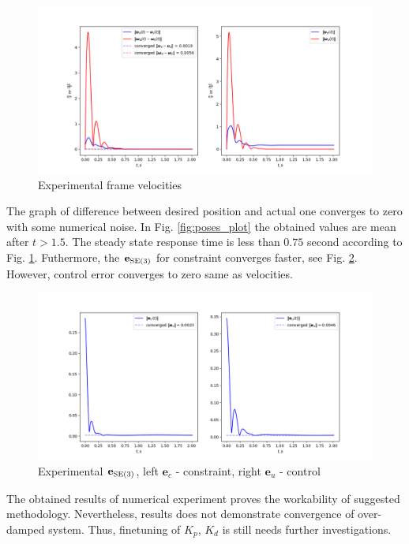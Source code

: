 \begin{figure}[H]
    \centering
    \includegraphics[scale=0.52]{figs/vels_history.png}
    \caption{Experimental frame velocities}
    \label{fig:vels_plot}
\end{figure}

The graph of difference between desired position and actual one converges to 
zero with some numerical noise. In Fig. \ref{fig:poses_plot} the obtained 
values are mean after $t > 1.5$. The steady state response time is less 
than $0.75$ second according to Fig. \ref{fig:vels_plot}. Futhermore, 
the $\mathbf{e}_{\text{SE}(3)}$ for constraint converges faster, see  
Fig. \ref{fig:errors_plot}. However, control error converges to zero 
same as velocities.

\begin{figure}[H]
    \centering
    \includegraphics[scale=0.52]{figs/errors_history.png}
    \caption{Experimental $\mathbf{e}_{\text{SE}(3)}$, left $\mathbf{e}_c$ - constraint, 
    right $\mathbf{e}_u$ - control}
    \label{fig:errors_plot}
\end{figure}

The obtained results of numerical experiment proves the workability 
of suggested methodology. Nevertheless, results does not demonstrate convergence 
of over-damped system. Thus, finetuning of $K_p$, $K_d$ is still needs 
further investigations.
